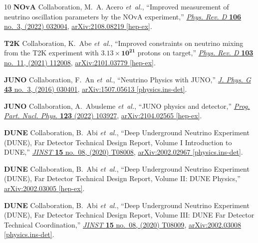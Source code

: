 \documentclass[aps, prd, onecolumn, tightenlines, notitlepage, superscriptaddress, nofootinbib, preprintnumbers, floatfix,showkeys,11pt]{revtex4-2}
\begin{document}
\begin{thebibliography}{10}
{\bfseries NOvA} Collaboration, M.~A. Acero {\em et~al.}, ``{Improved
  measurement of neutrino oscillation parameters by the NOvA experiment},''
  \href{http://dx.doi.org/10.1103/PhysRevD.106.032004}{{\em Phys. Rev. D}
  {\bfseries 106} no.~3, (2022) 032004},
  \href{http://arxiv.org/abs/2108.08219}{{\ttfamily arXiv:2108.08219
  [hep-ex]}}.

{\bfseries T2K} Collaboration, K.~Abe {\em et~al.}, ``{Improved constraints on
  neutrino mixing from the T2K experiment with $\mathbf{3.13\times10^{21}}$
  protons on target},''
  \href{http://dx.doi.org/10.1103/PhysRevD.103.112008}{{\em Phys. Rev. D}
  {\bfseries 103} no.~11, (2021) 112008},
  \href{http://arxiv.org/abs/2101.03779}{{\ttfamily arXiv:2101.03779
  [hep-ex]}}.

{\bfseries JUNO} Collaboration, F.~An {\em et~al.}, ``{Neutrino Physics with
  JUNO},'' \href{http://dx.doi.org/10.1088/0954-3899/43/3/030401}{{\em J. Phys.
  G} {\bfseries 43} no.~3, (2016) 030401},
  \href{http://arxiv.org/abs/1507.05613}{{\ttfamily arXiv:1507.05613
  [physics.ins-det]}}.

{\bfseries JUNO} Collaboration, A.~Abusleme {\em et~al.}, ``{JUNO physics and
  detector},'' \href{http://dx.doi.org/10.1016/j.ppnp.2021.103927}{{\em Prog.
  Part. Nucl. Phys.} {\bfseries 123} (2022) 103927},
  \href{http://arxiv.org/abs/2104.02565}{{\ttfamily arXiv:2104.02565
  [hep-ex]}}.

{\bfseries DUNE} Collaboration, B.~Abi {\em et~al.}, ``{Deep Underground
  Neutrino Experiment (DUNE), Far Detector Technical Design Report, Volume I
  Introduction to DUNE},''
  \href{http://dx.doi.org/10.1088/1748-0221/15/08/T08008}{{\em JINST}
  {\bfseries 15} no.~08, (2020) T08008},
  \href{http://arxiv.org/abs/2002.02967}{{\ttfamily arXiv:2002.02967
  [physics.ins-det]}}.

{\bfseries DUNE} Collaboration, B.~Abi {\em et~al.}, ``{Deep Underground
  Neutrino Experiment (DUNE), Far Detector Technical Design Report, Volume II:
  DUNE Physics},'' \href{http://arxiv.org/abs/2002.03005}{{\ttfamily
  arXiv:2002.03005 [hep-ex]}}.

{\bfseries DUNE} Collaboration, B.~Abi {\em et~al.}, ``{Deep Underground
  Neutrino Experiment (DUNE), Far Detector Technical Design Report, Volume III:
  DUNE Far Detector Technical Coordination},''
  \href{http://dx.doi.org/10.1088/1748-0221/15/08/T08009}{{\em JINST}
  {\bfseries 15} no.~08, (2020) T08009},
  \href{http://arxiv.org/abs/2002.03008}{{\ttfamily arXiv:2002.03008
  [physics.ins-det]}}.


\end{thebibliography}
\end{document}
